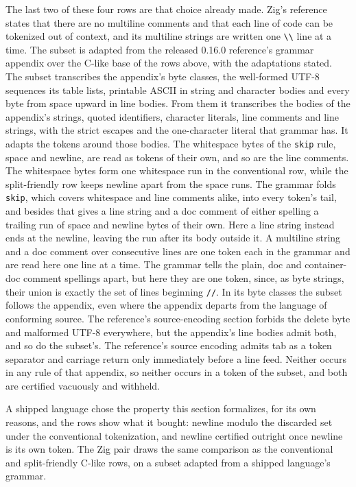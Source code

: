 \documentclass[11pt,a4paper]{article}
\theoremstyle{definition}
\theoremstyle{plain}
\newcommand{\code}[1]{\texttt{#1}}
\begin{document}
The last two of these four rows are that choice already made. Zig's reference~\cite{zig2026reference} states that there
are no multiline comments and that each line of code can be tokenized out of context, and its multiline strings are
written one \code{\textbackslash\textbackslash} line at a time. The subset is adapted from the released 0.16.0
reference's grammar appendix over the C-like base of the rows above, with the adaptations stated. The subset transcribes
the appendix's byte classes, the well-formed UTF-8 sequences its table lists, printable ASCII in string and character
bodies and every byte from space upward in line bodies. From them it transcribes the bodies of the appendix's strings,
quoted identifiers, character literals, line comments and line strings, with the strict escapes and the one-character
literal that grammar has. It adapts the tokens around those bodies. The whitespace bytes of the \code{skip} rule, space
and newline, are read as tokens of their own, and so are the line comments. The whitespace bytes form one whitespace run
in the conventional row, while the split-friendly row keeps newline apart from the space runs. The grammar folds
\code{skip}, which covers whitespace and line comments alike, into every token's tail, and besides that gives a line
string and a doc comment of either spelling a trailing run of space and newline bytes of their own. Here a line string
instead ends at the newline, leaving the run after its body outside it. A multiline string and a doc comment over
consecutive lines are one token each in the grammar and are read here one line at a time. The grammar tells the plain,
doc and container-doc comment spellings apart, but here they are one token, since, as byte strings, their union is
exactly the set of lines beginning \code{//}. In its byte classes the subset follows the appendix, even where the
appendix departs from the language of conforming source. The reference's source-encoding section forbids the delete byte
and malformed UTF-8 everywhere, but the appendix's line bodies admit both, and so do the subset's. The reference's
source encoding admits tab as a token separator and carriage return only immediately before a line feed. Neither occurs
in any rule of that appendix, so neither occurs in a token of the subset, and both are certified vacuously and withheld.

A shipped language chose the property this section formalizes, for its own reasons, and the rows show what it bought:
newline modulo the discarded set under the conventional tokenization, and newline certified outright once newline is its
own token. The Zig pair draws the same comparison as the conventional and split-friendly C-like rows, on a subset
adapted from a shipped language's grammar.
\end{document}
